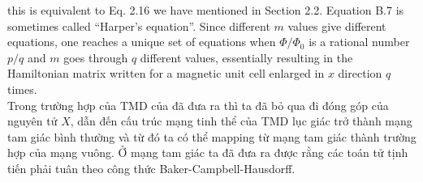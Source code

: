 \documentclass{report}
\begin{document}
this is equivalent to Eq. 2.16 we have mentioned in Section 2.2. Equation B.7 is sometimes called ``Harper's equation''. \cite{harper1955general} Since different $m$ values give different equations, one reaches a unique set of equations when $\Phi / \Phi_{0}$ is a rational number $p / q$ and $m$ goes through $q$ different values, essentially resulting in the Hamiltonian matrix written for a magnetic unit cell enlarged in $x$ direction $q$ times. \\
Trong trường hợp của TMD của \cite{PhysRevB.88.085433} đã đưa ra thì ta đã bỏ qua đi đóng góp của nguyên tử $X$, dẫn đến cấu trúc mạng tinh thể của TMD lục giác trở thành mạng tam giác bình thường và từ đó ta có thể mapping từ mạng tam giác thành trường hợp của mạng vuông. Ở mạng tam giác ta đã đưa ra được rằng các toán tử tịnh tiến phải tuân theo công thức Baker-Campbell-Hausdorff.
\end{document}
